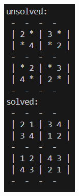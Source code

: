 \documentclass[]{final_report}
\begin{document}
\begin{figure}[ht]
    \centering 
    \begin{minipage}{0.3\textwidth} 
        \includegraphics[width=\textwidth]{images/terminal 2x2.png} 

\end{minipage}
\end{figure}
\end{document}
